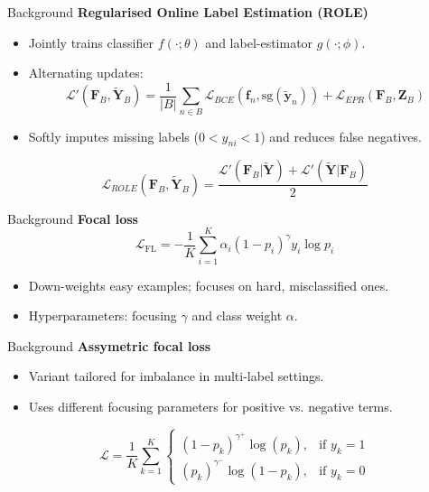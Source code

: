 
\begin{frame}{Background}
  \textbf{Regularised Online Label Estimation (ROLE)}
  \begin{itemize}
    \item Jointly trains classifier $f(\cdot;\theta)$ and label-estimator $g(\cdot;\phi)$.
    \item Alternating updates:
      \[
        \mathcal{L}'(\mathbf{F}_B,\tilde{\mathbf{Y}}_B) = \frac{1}{|B|}\sum_{n\in B} \mathcal{L}_{BCE}(\mathbf{f}_n,\text{sg}(\tilde{\mathbf{y}}_n)) + \mathcal{L}_{EPR}(\mathbf{F}_B,\mathbf{Z}_B)
      \]
    \item Softly imputes missing labels ($0<y_{ni}<1$) and reduces false negatives.
  \end{itemize}
  \begin{equation*}
    \mathcal{L}_{ROLE}(\mathbf{F}_B, \mathbf{\tilde{Y}}_B) = \frac{\mathcal{L}'(\mathbf{F}_B|\mathbf{\tilde{Y}})+\mathcal{L}'(\mathbf{\tilde{Y}}|\mathbf{F}_B)}{2}
  \end{equation*}
\end{frame}

\begin{frame}{Background}
  \textbf{Focal loss}
  \begin{equation*}
    \mathcal{L}_{\text{FL}} = -\frac{1}{K}\sum_{i=1}^{K}\alpha_i(1-p_i)^{\gamma}y_i\log p_i
  \end{equation*}

  \begin{itemize}
    \item Down-weights easy examples; focuses on hard, misclassified ones.
    \item Hyperparameters: focusing $\gamma$ and class weight $\alpha$.
  \end{itemize}
\end{frame}

\begin{frame}{Background}
  \textbf{Assymetric focal loss}
  \begin{itemize}
    \item Variant tailored for imbalance in multi-label settings.
    \item Uses different focusing parameters for positive vs. negative terms.
  \end{itemize}
  \begin{equation*}
    \mathcal{L} = \frac{1}{K} \sum_{k=1}^{K}
    \begin{cases}
      (1 - p_k)^{\gamma^+} \log(p_k), & \text{if } y_k = 1 \\
      (p_k)^{\gamma^-} \log(1 - p_k), & \text{if } y_k = 0
    \end{cases}
  \end{equation*}
\end{frame}


